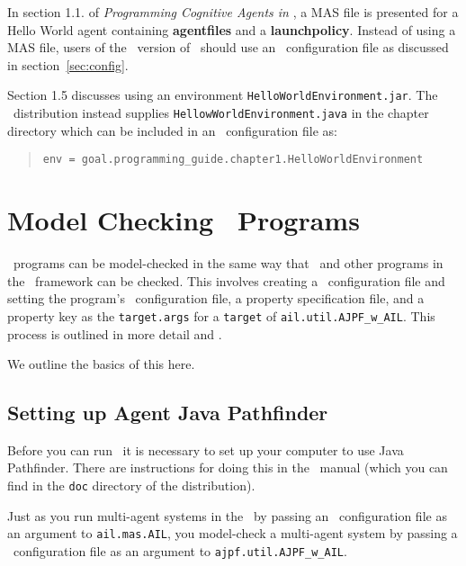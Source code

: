 In section 1.1. of \emph{Programming Cognitive Agents in \goal}, a MAS file is presented for a Hello World agent containing {\bf agentfiles} and a {\bf launchpolicy}.  Instead of using a MAS file, users of the \ail\ version of \goal\ should use an \ail\ configuration file as discussed in section~\ref{sec:config}.

Section 1.5 discusses using an environment \texttt{HelloWorldEnvironment.jar}.  The \mcapl\ distribution instead supplies \texttt{HellowWorldEnvironment.java} in the chapter directory which can be included in an \ail\ configuration file as:

\begin{quote}
  \texttt{env = goal.programming\_guide.chapter1.HelloWorldEnvironment}
\end{quote}

\section{Model Checking \goal\ Programs}

\goal\ programs can be model-checked in the same way that \gwendolen\ and other programs in the \ail\ framework can be checked.  This involves creating a \jpf\ configuration file and setting the program's \ail\ configuration file, a property specification file, and a property key as the \texttt{target.args} for a \texttt{target} of \texttt{ail.util.AJPF\_w\_AIL}.  This process is outlined in more detail  and .

We outline the basics of this here.

\subsection{Setting up Agent Java Pathfinder}
Before you can run \ajpf\ it is necessary to set up your computer to use Java Pathfinder.  There are instructions for doing this in the \mcapl\ manual (which you can find in the \texttt{doc} directory of the distribution).

Just as you run multi-agent systems in the \ail\ by passing an \ail\ configuration file as an argument to \texttt{ail.mas.AIL}, you model-check a multi-agent system by passing a \jpf\ configuration file as an argument to \texttt{ajpf.util.AJPF\_w\_AIL}.

